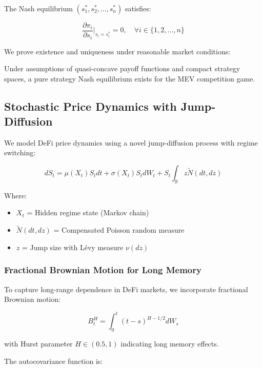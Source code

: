 \documentclass[12pt]{article}
\begin{document}
The Nash equilibrium $(s_1^*, s_2^*, \ldots, s_n^*)$ satisfies:

\begin{equation}
\frac{\partial \pi_i}{\partial s_i}\bigg|_{s_i = s_i^*} = 0, \quad \forall i \in \{1, 2, \ldots, n\}
\end{equation}

We prove existence and uniqueness under reasonable market conditions:

\begin{theorem}
Under assumptions of quasi-concave payoff functions and compact strategy spaces, a pure strategy Nash equilibrium exists for the MEV competition game.
\end{theorem}

\subsection{Stochastic Price Dynamics with Jump-Diffusion}

We model DeFi price dynamics using a novel jump-diffusion process with regime switching:

\begin{equation}
dS_t = \mu(X_t) S_t dt + \sigma(X_t) S_t dW_t + S_t \int_{\mathbb{R}} z \tilde{N}(dt, dz)
\end{equation}

Where:
\begin{itemize}
    \item $X_t$ = Hidden regime state (Markov chain)
    \item $\tilde{N}(dt, dz)$ = Compensated Poisson random measure
    \item $z$ = Jump size with Lévy measure $\nu(dz)$
\end{itemize}

\subsubsection{Fractional Brownian Motion for Long Memory}

To capture long-range dependence in DeFi markets, we incorporate fractional Brownian motion:

\begin{equation}
B_t^H = \int_0^t (t-s)^{H-1/2} dW_s
\end{equation}

with Hurst parameter $H \in (0.5, 1)$ indicating long memory effects.

The autocovariance function is:
\end{document}
